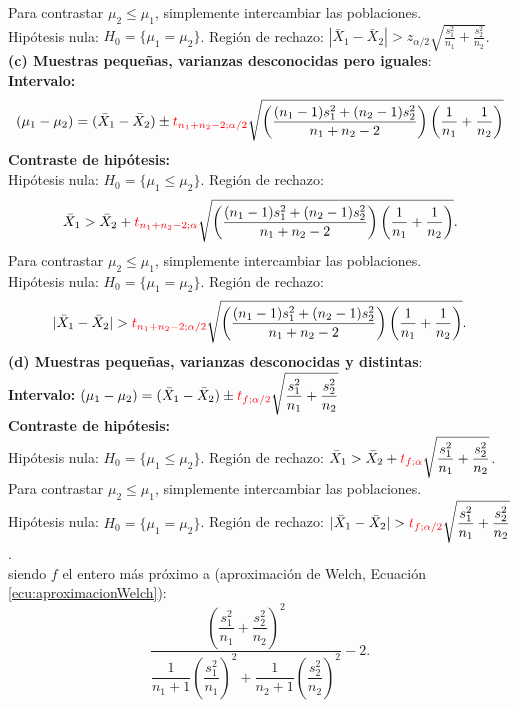 \begin{itemize}
\begin{table}[h]
{\begin{minipage}{14cm}
       Para contrastar $\mu_2\leq\mu_1$, simplemente intercambiar las poblaciones.\\
       Hipótesis nula: $H_0=\{\mu_1=\mu_2\}$. Región de rechazo: $|\bar X_1-\bar X_2|>\displaystyle{z_{\alpha/2}}{\sqrt{\frac{s_1^2}{n_1}+\frac{s_2^2}{n_2}}}$.\\
       {\bf (c) Muestras pequeñas, varianzas desconocidas pero iguales}:\\
       {\bf Intervalo:}\\
       \[(\mu_1-\mu_2)=(\bar X_1-\bar X_2)\pm \textcolor{red}{t_{n_1+n_2-2;\alpha/2}}\sqrt{\left(\dfrac{(n_1-1)s_1^2+(n_2-1)s_2^2}{n_1+n_2-2}\right)\left(\dfrac{1}{n_1}+\dfrac{1}{n_2}\right)}\]
       {\bf Contraste de hipótesis:\\}
       Hipótesis nula: $H_0=\{\mu_1\leq\mu_2\}$. Región de rechazo:
       \[\bar X_1>\bar X_2+\displaystyle{\textcolor{red}{t_{n_1+n_2-2;\alpha}}}{\sqrt{\left(\dfrac{(n_1-1)s_1^2+(n_2-1)s_2^2}{n_1+n_2-2}\right)\left(\dfrac{1}{n_1}+\dfrac{1}{n_2}\right)}}.\]
       Para contrastar $\mu_2\leq\mu_1$, simplemente intercambiar las poblaciones.\\
       Hipótesis nula: $H_0=\{\mu_1=\mu_2\}$. Región de rechazo:
       \[|\bar X_1-\bar X_2|>\displaystyle{\textcolor{red}{t_{n_1+n_2-2;\alpha/2}}}{\sqrt{\left(\dfrac{(n_1-1)s_1^2+(n_2-1)s_2^2}{n_1+n_2-2}\right)\left(\dfrac{1}{n_1}+\dfrac{1}{n_2}\right)}}.\]
       {\bf (d) Muestras pequeñas, varianzas desconocidas y distintas}:\\
       {\bf Intervalo:}       $\displaystyle(\mu_1-\mu_2)=(\bar X_1-\bar X_2)\pm \textcolor{red}{t_{f;\alpha/2}}\sqrt{\dfrac{s_1^2}{n_1}+\dfrac{s_2^2}{n_2}}$\\
       {\bf Contraste de hipótesis:\\}
       Hipótesis nula: $H_0=\{\mu_1\leq\mu_2\}$. Región de rechazo: $\bar X_1>\bar X_2+\textcolor{red}{t_{f;\alpha}}\sqrt{\dfrac{s_1^2}{n_1}+\dfrac{s_2^2}{n_2}}$.\\
       Para contrastar $\mu_2\leq\mu_1$, simplemente intercambiar las poblaciones.\\
       Hipótesis nula: $H_0=\{\mu_1=\mu_2\}$. Región de rechazo: $|\bar X_1-\bar X_2|>\textcolor{red}{t_{f;\alpha/2}}\sqrt{\dfrac{s_1^2}{n_1}+\dfrac{s_2^2}{n_2}}$.\\
       siendo $f$ el entero más próximo a (aproximación de Welch, Ecuación \ref{ecu:aproximacionWelch}):
       \[\dfrac{\left(\dfrac{s_1^2}{n_1}+\dfrac{s_2^2}{n_2}\right)^2}{\dfrac{1}{n_1+1}\left(\dfrac{s_1^2}{n_1}\right)^2+\dfrac{1}{n_2+1}\left(\dfrac{s_2^2}{n_2}\right)^2}-2.\]
       \end{minipage}}\\[3mm]
       \end{table}






    \end{itemize}



